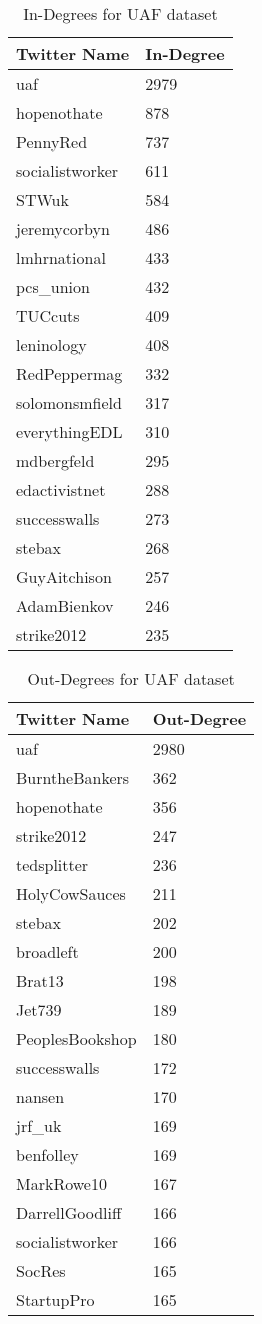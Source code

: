 \begin{table}[htbp]%
\centering
\begin{tabular}{|l|l|}
\hline
Twitter Name & In-Degree \\
\hline
uaf & 2979 \\
hopenothate & 878 \\
PennyRed & 737 \\
socialistworker & 611 \\
STWuk & 584 \\
jeremycorbyn & 486 \\
lmhrnational & 433 \\
pcs\_union & 432 \\
TUCcuts & 409 \\
leninology & 408 \\
RedPeppermag & 332 \\
solomonsmfield & 317 \\
everythingEDL & 310 \\
mdbergfeld & 295 \\
edactivistnet & 288 \\
successwalls & 273 \\
stebax & 268 \\
GuyAitchison & 257 \\
AdamBienkov & 246 \\
strike2012 & 235 \\
\hline
\end{tabular}
\caption{In-Degrees for UAF dataset}
\label{tab:uafin}
\end{table}

\begin{table}[htbp]%
\centering
\begin{tabular}{|l|l|}
\hline
Twitter Name & Out-Degree \\
\hline
uaf & 2980 \\
BurntheBankers & 362 \\
hopenothate & 356 \\
strike2012 & 247 \\
tedsplitter & 236 \\
HolyCowSauces & 211 \\
stebax & 202 \\
broadleft & 200 \\
Brat13 & 198 \\
Jet739 & 189 \\
PeoplesBookshop & 180 \\
successwalls & 172 \\
nansen & 170 \\
jrf\_uk & 169 \\
benfolley & 169 \\
MarkRowe10 & 167 \\
DarrellGoodliff & 166 \\
socialistworker & 166 \\
SocRes & 165 \\
StartupPro & 165 \\
\hline
\end{tabular}
\caption{Out-Degrees for UAF dataset}
\label{tab:uafout}
\end{table}


